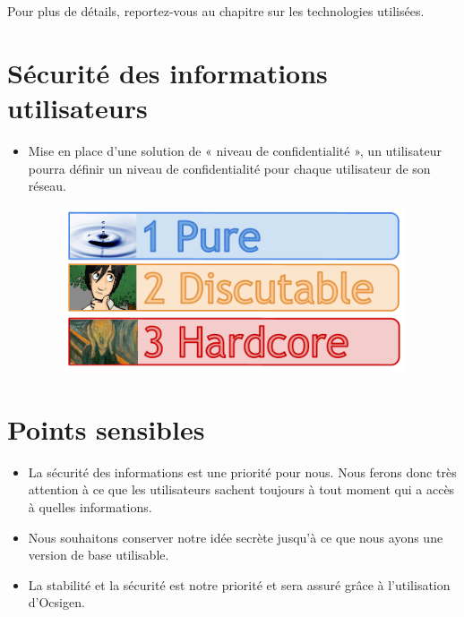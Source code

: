 \documentclass{life-fr}
\begin{document}
Pour plus de détails, reportez-vous au chapitre sur les technologies utilisées.

\section{Sécurité des informations utilisateurs}

\begin{itemize}
  \item Mise en place d’une solution de « niveau de confidentialité », un utilisateur pourra définir un niveau de confidentialité pour chaque utilisateur de son réseau. 

\begin{figure}[H]
  \begin{center}
    \includegraphics[width=10cm]{img/confidentialite.png}
  \end{center}
\end{figure}

\end{itemize}

\section{Points sensibles}

\begin{itemize}
  \item La sécurité des informations est une priorité pour nous. Nous ferons donc très attention à ce que les utilisateurs sachent toujours à tout moment qui a accès à quelles informations.
  \item Nous souhaitons conserver notre idée secrète jusqu’à ce que nous ayons une version de base utilisable.
  \item La stabilité et la sécurité est notre priorité et sera assuré grâce à l'utilisation d'Ocsigen.
\end{itemize}

\end{document}
